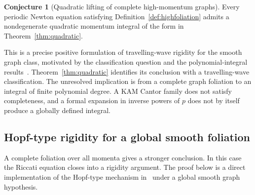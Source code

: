 \documentclass[review,12pt,times,a4paper,nopreprintline]{elsarticle}
\theoremstyle{plain}
\theoremstyle{definition}
\newtheorem{conjecture}[theorem]{Conjecture}
\theoremstyle{remark}
\numberwithin{equation}{section}
\begin{document}
\begin{conjecture}[Quadratic lifting of complete high-momentum graphs]\label{conj:quadraticlift}
Every periodic Newton equation satisfying Definition~\ref{def:highfoliation} admits a nondegenerate quadratic momentum integral of the form in Theorem~\ref{thm:quadratic}.
\end{conjecture}
This is a precise positive formulation of travelling-wave rigidity for the smooth graph class, motivated by the classification question and the polynomial-integral results~\cite{OpenProblems2026,BialyBenney}. Theorem~\ref{thm:quadratic} identifies its conclusion with a travelling-wave classification. The unresolved implication is from a complete graph foliation to an integral of finite polynomial degree. A KAM Cantor family does not satisfy completeness, and a formal expansion in inverse powers of $p$ does not by itself produce a globally defined integral.

\subsection{Hopf-type rigidity for a global smooth foliation}
A complete foliation over all momenta gives a stronger conclusion. In this case the Riccati equation closes into a rigidity argument. The proof below is a direct implementation of the Hopf-type mechanism in~\cite{BialyPolterovich} under a global smooth graph hypothesis.
\end{document}
